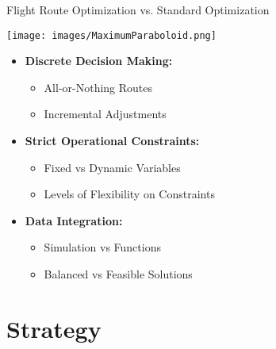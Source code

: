 \documentclass[aspectratio=169,xcolor=dvipsnames]{beamer}
\begin{document}
\begin{frame}{Flight Route Optimization vs. Standard Optimization}
    \begin{minipage}{0.45\textwidth}
        \centering
        \texttt{[image: images/MaximumParaboloid.png]}
    \end{minipage}
    \hfill
    \begin{minipage}{0.5\textwidth}
        \begin{itemize}
            \item \textbf{Discrete Decision Making:}
            \begin{itemize}
                \item All-or-Nothing Routes
                \item Incremental Adjustments
            \end{itemize}
            
            \item \textbf{Strict Operational Constraints:}
            \begin{itemize}
                \item Fixed vs Dynamic Variables
                \item Levels of Flexibility on Constraints
            \end{itemize}
            
            \item \textbf{Data Integration:}
            \begin{itemize}
                \item Simulation vs Functions
                \item Balanced vs Feasible Solutions
            \end{itemize}
        \end{itemize}
    \end{minipage}
\end{frame}

\section{Strategy}
\end{document}
